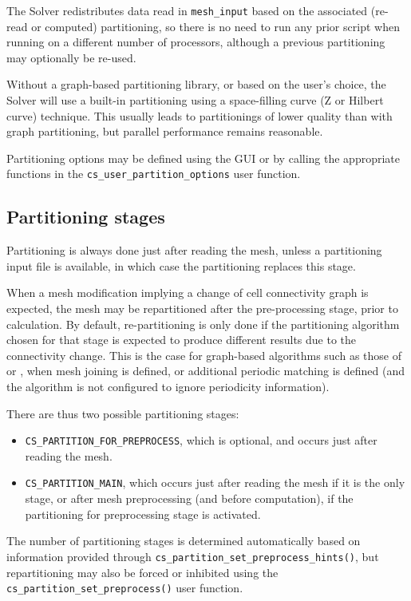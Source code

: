 {{{The Solver redistributes data read in {\tt mesh\_input} based on the associated
(re-read or computed) partitioning, so there is no need to run any
prior script when running on a different number of processors, although
a previous partitioning may optionally be re-used.

Without a graph-based partitioning library, or based on the user's choice,
the Solver will use a built-in partitioning using a space-filling curve
(Z or Hilbert curve) technique. This usually leads to partitionings
of lower quality than with graph partitioning, but parallel
performance remains reasonable.

Partitioning options may be defined using the GUI or by calling
the appropriate functions in the
\texttt{cs\_user\_partition\_options} user function.

\subsection{Partitioning stages\label{sec:parall:part:stages}}

Partitioning is always done just after reading the mesh, unless a
partitioning input file is available, in which case the partitioning
replaces this stage.

When a mesh modification implying a change of cell connectivity graph
is expected, the mesh may be repartitioned after the pre-processing
stage, prior to calculation. By default, re-partitioning is only done
if the partitioning algorithm chosen for that stage is expected to
produce different results due to the connectivity change. This is
the case for graph-based algorithms such as those of \metis or \scotch,
when mesh joining is defined, or additional periodic matching is defined
(and the algorithm is not configured to ignore periodicity information).

There are thus two possible partitioning stages:

\begin{itemize}
\item \texttt{CS\_PARTITION\_FOR\_PREPROCESS}, which is optional, and
      occurs just  after reading the mesh.
\item \texttt{CS\_PARTITION\_MAIN}, which occurs just after reading the
      mesh if it is the only stage, or after mesh preprocessing (and
      before computation), if the partitioning for preprocessing stage
      is activated.
\end{itemize}

The number of partitioning stages is determined automatically based on
information provided through \texttt{cs\_partition\_set\_preprocess\_hints()},
but repartitioning may also be forced or inhibited using the
\texttt{cs\_partition\_set\_preprocess()} user function.

}}}
